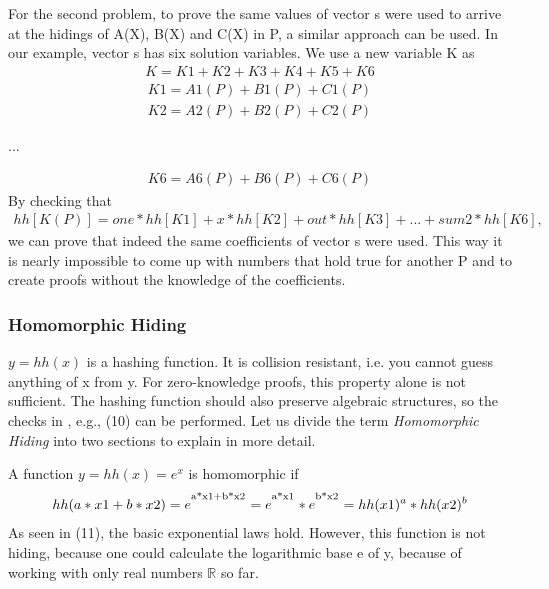 For the second problem, to prove the same values of vector s were used to arrive at the hidings of A(X), B(X) and C(X) in P, a similar approach can be used. In our example, vector s has six solution variables. We use a new variable K as
\begin{align}
    K = K1 + K2 + K3 + K4 + K5 + K6
\end{align}
\begin{align*}
    K1 = A1(P) + B1(P) + C1(P)\\K2 = A2(P) + B2(P) + C2(P)
\end{align*}
\begin{center}
    ... \\
\end{center}
\begin{align*}
    K6 = A6(P) + B6(P) + C6(P)
\end{align*}
By checking that 
\begin{align}
    hh[K(P)] = one*hh[K1] + x * hh[K2] + out * hh[K3] + ... + sum2 * hh[K6],
\end{align}
we can prove that indeed the same coefficients of vector s were used. This way it is nearly impossible to come up with numbers that hold true for another P and to create proofs without the knowledge of the coefficients.

\subsubsection{Homomorphic Hiding}

\(y = hh(x)\) is a hashing function. It is collision resistant, i.e. you cannot guess anything of x from y. For zero-knowledge proofs, this property alone is not sufficient. The hashing function should also preserve algebraic structures, so the checks in , e.g., (10) can be performed. Let us divide the term \textit{Homomorphic Hiding} into two sections to explain in more detail.

A function \(y = hh(x) = e^x\) is homomorphic if
\begin{align}
    hh(a*x1 + b*x2) = e^\textsuperscript{a*x1+b*x2} = e^\textsuperscript{a*x1} * e^\textsuperscript{b*x2} = hh(x1)^a * hh(x2)^b
\end{align}
As seen in (11), the basic exponential laws hold. However, this function is not hiding, because one could calculate the logarithmic base e of y, because of working with only real numbers \begin{math}\mathbb{R}  
\end{math} so far.


